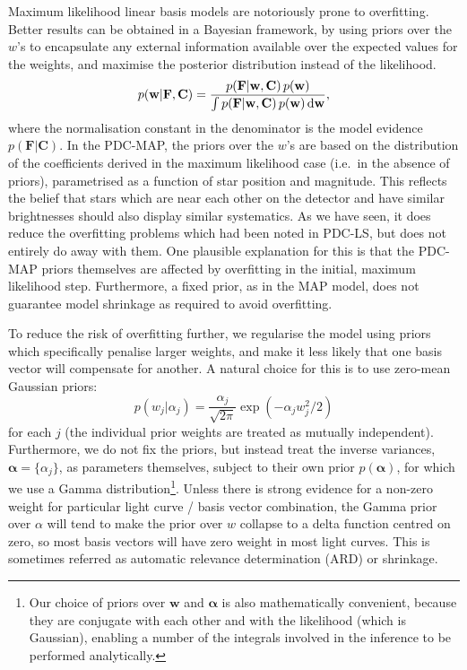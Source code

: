 \documentclass[useAMS,usenatbib]{mn2e}
\begin{document}
Maximum likelihood linear basis models are notoriously prone
to overfitting. Better results can be obtained in a Bayesian
framework, by using
priors over the $w$'s to encapsulate any external information
available over the expected values for the weights, and maximise the
posterior distribution instead of the likelihood. 
\begin{equation}
p(\mathbf{w}|\mathbf{F},\mathbf{C}) =
\frac{p(\mathbf{F}|\mathbf{w},\mathbf{C})  \, p(\mathbf{w})}{\int
  p(\mathbf{F}|\mathbf{w},\mathbf{C}) \, p(\mathbf{w}) \, {\rm d}\mathbf{w}},
\end{equation} 
where the normalisation constant in the denominator is the model
evidence $p(\mathbf{F}|\mathbf{C})$. In the PDC-MAP, the priors over
the $w$'s are based on the distribution of the coefficients derived in
the maximum likelihood case (i.e.\ in the absence of priors),
parametrised as a function of star position and magnitude. This
reflects the belief that stars which are near each other on the
detector and have similar brightnesses should also display similar
systematics. As we have seen, it does reduce the overfitting problems
which had been noted in PDC-LS, but does not entirely do away with
them. One plausible explanation for this is that the PDC-MAP priors
themselves are affected by overfitting in the initial, maximum
likelihood step. Furthermore, a fixed prior, as in the MAP model,
does not guarantee model shrinkage as required to avoid overfitting. 

To reduce the risk of overfitting further, we regularise the model using priors
which specifically penalise larger weights, and make it less likely
that one basis vector will compensate for another. A natural choice
for this is to use zero-mean Gaussian priors:
\begin{equation}
p(w_j|\alpha_j) = \frac{\alpha_j}{\sqrt{2 \pi}} \exp\left(-\alpha_j w_j^2 / 2 \right)
\end{equation}
for each $j$ (the individual prior weights are treated as
mutually independent).  Furthermore, we do not fix the priors, but
instead treat the inverse variances, $\boldsymbol{\alpha} = \{\alpha_j\}$, as
parameters themselves, subject to their own prior
$p(\boldsymbol{\alpha})$, for which we use a Gamma
distribution\footnote{Our choice of priors over $\mathbf{w}$ and
  $\boldsymbol{\alpha}$ is also mathematically convenient, because
  they are conjugate with each other and with the likelihood (which is
  Gaussian), enabling a number of the integrals involved in the
  inference to be performed analytically.}. Unless there is strong evidence for a non-zero weight
for particular light curve / basis vector combination, the Gamma prior over
$\alpha$ will tend to make the prior over $w$ collapse to a delta
function centred on zero, so most basis vectors will have zero weight in most
light curves. This is sometimes referred as
automatic relevance determination (ARD) or shrinkage.
\end{document}

